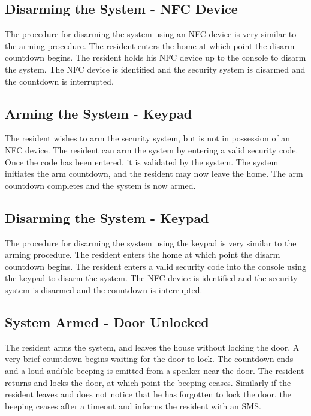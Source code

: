 \documentclass{report}
\begin{document}
\subsection*{Disarming the System - NFC Device}

The procedure for disarming the system using an NFC device is very similar to
the arming procedure. The resident enters the home at which point the disarm
countdown begins. The resident holds his NFC device up to the console to disarm
the system. The NFC device is identified and the security system is disarmed
and the countdown is interrupted.

\subsection*{Arming the System - Keypad}

The resident wishes to arm the security system, but is not in possession of an
NFC device.  The resident can arm the system by entering a valid security code.
Once the code has been entered, it is validated by the system. The system
initiates the arm countdown, and the resident may now leave the home. The arm
countdown completes and the system is now armed.

\subsection*{Disarming the System - Keypad}

The procedure for disarming the system using the keypad is very similar to the
arming procedure. The resident enters the home at which point the disarm
countdown begins. The resident enters a valid security code into the console
using the keypad to disarm the system.  The NFC device is identified and the
security system is disarmed and the countdown is interrupted.

\subsection*{System Armed - Door Unlocked}

The resident arms the system, and leaves the house without locking the door.
A very brief countdown begins waiting for the door to lock. The countdown
ends and a loud audible beeping is emitted from a speaker near the door. The
resident returns and locks the door, at which point the beeping ceases.
Similarly if the resident leaves and does not notice that he has forgotten to
lock the door, the beeping ceases after a timeout and informs the resident with
an SMS.
\end{document}
